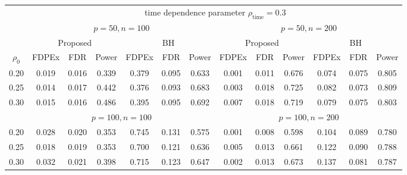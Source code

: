 \documentclass[12pt]{article}
\theoremstyle{definition}
\begin{document}
\begin{table}[!htb]
\begin{center}
\begin{tabular}{c|ccc|ccc|ccc|ccc}
 & \multicolumn{12}{c}{time dependence parameter $\rho_{\mathrm{\scriptstyle time}} = 0.3$} 
\\ \cline{2-13} 
 & \multicolumn{6}{c|}{$p = 50, n = 100$} & \multicolumn{6}{c}{$p = 50, n = 200$}
\\ \cline{2-13} 
 & \multicolumn{3}{c|}{Proposed} & \multicolumn{3}{c|}{BH} & \multicolumn{3}{c|}{Proposed} & \multicolumn{3}{c}{BH} 
\\ \cline{2-13} 
$\rho_0$ & FDPEx & FDR & Power & FDPEx & FDR & Power & FDPEx & FDR & Power & FDPEx & FDR & Power 
\\ \hline
0.20 &0.019&0.016&0.339&0.379&0.095&0.633 &0.001&0.011&0.676&0.074&0.075&0.805
\\ \cline{2-13}
0.25 &0.014&0.017&0.442&0.376&0.093&0.683 &0.003&0.018&0.725&0.082&0.073&0.809
\\ \cline{2-13}
0.30 &0.015&0.016&0.486&0.395&0.095&0.692 &0.007&0.018&0.719&0.079&0.075&0.803
\\ \hline
 & \multicolumn{6}{c|}{$p = 100, n = 100$} & \multicolumn{6}{c}{$p = 100, n = 200$}
\\ \hline
0.20 &0.028&0.020&0.353&0.745&0.131&0.575 &0.001&0.008&0.598&0.104&0.089&0.780
\\ \cline{2-13}
0.25 &0.018&0.019&0.353&0.700&0.121&0.636 &0.005&0.013&0.661&0.122&0.090&0.788
\\ \cline{2-13}
0.30 &0.032&0.021&0.398&0.715&0.123&0.647 &0.002&0.013&0.673&0.137&0.081&0.787
\\ \hline\hline

\end{tabular}		
\end{center}
\end{table}
\fi
\end{document}
